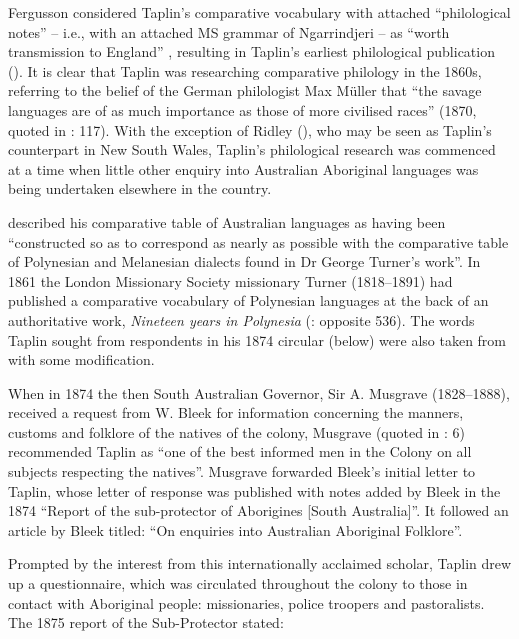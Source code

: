 Fergusson considered Taplin’s comparative vocabulary with attached “philological notes” – i.e., with an attached MS grammar of Ngarrindjeri – as “worth transmission to England” \citep[119]{grimwade_george_1975}, resulting in Taplin’s earliest philological publication (\citeyear{taplin_notes_1872}). It is clear that Taplin was researching comparative philology in the 1860s, referring to the belief of the German philologist Max Müller that “the savage languages are of as much importance as those of more civilised races” (1870, quoted in \citealt{grimwade_george_1975}: 117). With the exception of Ridley (), who may be seen as Taplin’s counterpart in New South Wales, Taplin’s philological research was commenced at a time when little other enquiry into Australian Aboriginal languages was being undertaken elsewhere in the country.

\citet[84]{taplin_notes_1872} described his comparative table of Australian languages as having been “constructed so as to correspond as nearly as possible with the comparative table of Polynesian and Melanesian dialects found in Dr George Turner’s work”. In {1861} the London Missionary Society missionary Turner (1818--1891) had published a comparative vocabulary of Polynesian languages at the back of an authoritative work, \textit{Nineteen years in Polynesia} (\citeyear{turner_nineteen_1861}: opposite 536). The words Taplin sought from respondents in his 1874 circular (below) were also taken from \citet{turner_nineteen_1861} with some modification.

When in 1874 the then South Australian Governor, Sir A. Musgrave (1828--1888), received a request from W. Bleek for information concerning the manners, customs and folklore of the natives of the colony, Musgrave (quoted in \citealt{bleek_inquiries_1874}: 6) recommended Taplin as “one of the best informed men in the Colony on all subjects respecting the natives”. Musgrave forwarded Bleek’s initial letter to Taplin, whose letter of response was published with notes added by Bleek in the 1874 “Report of the sub-protector of Aborigines [South Australia]”. It followed an article by Bleek titled: “On enquiries into Australian Aboriginal Folklore”.

Prompted by the interest from this internationally acclaimed scholar, Taplin drew up a questionnaire, which was circulated throughout the colony to those in contact with Aboriginal people: missionaries, police troopers and pastoralists. The 1875 report of the Sub-Protector stated:

